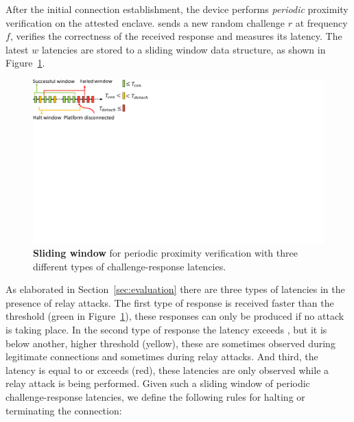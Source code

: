 After the initial connection establishment, the \device device performs \emph{periodic} proximity verification on the attested enclave. \device sends a new random challenge $r$ at frequency $f$, verifies the correctness of the received response and measures its latency. The latest $w$ latencies are stored to a sliding window data structure, as shown in Figure~\ref{fig:slidingWindow}.

\begin{figure}[t]
  \centering
   \includegraphics[trim={0 14cm 20cm 0}, clip, width=0.7\linewidth]{chapters/ProximiTEE/figures/SlidingWindow_1.pdf}
    \caption[\name periodic proximity verification]{\textbf{Sliding window} for periodic proximity verification with three different types of challenge-response latencies.}
    \label{fig:slidingWindow}
\end{figure}

As elaborated in Section~\ref{sec:evaluation} there are three types of latencies in the presence of relay attacks. The first type of response is received faster than the  threshold \connect (green in Figure~\ref{fig:slidingWindow}), these responses can only be produced if no attack is taking place. In the second type of response the latency exceeds \connect, but it is below another, higher threshold \detach (yellow), these are sometimes observed during legitimate connections and sometimes during relay attacks. And third, the latency is equal to or exceeds \detach (red), these latencies are only observed while a relay attack is being performed. Given such a sliding window of periodic challenge-response latencies, we define the following rules for halting or terminating the connection:

